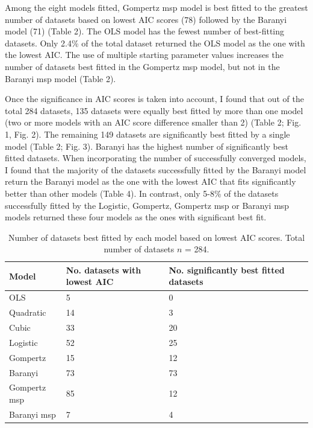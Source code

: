 \documentclass[11pt]{article}
\begin{document}
Among the eight models fitted, Gompertz msp model is best fitted to the greatest number of datasets based on lowest AIC scores (78) followed by the Baranyi model (71) (Table 2). The OLS model has the fewest number of best-fitting datasets. Only 2.4\% of the total dataset returned the OLS model as the one with the lowest AIC. The use of multiple starting parameter values increases the number of datasets best fitted in the Gompertz msp model, but not in the Baranyi msp model (Table 2).
\vspace{\baselineskip}

Once the significance in AIC scores is taken into account, I found that out of the total 284 datasets, 135 datasets were equally best fitted by more than one model (two or more models with an AIC score difference smaller than 2) (Table 2; Fig. 1, Fig. 2). The remaining 149 datasets are significantly best fitted by a single model (Table 2; Fig. 3). Baranyi has the highest number of significantly best fitted datasets. When incorporating the number of successfully converged models, I found that the majority of the datasets successfully fitted by the Baranyi model return the Baranyi model as the one with the lowest AIC that fits significantly better than other models (Table 4). In contrast, only 5-8\% of the datasets successfully fitted by the Logistic, Gompertz, Gompertz msp or Baranyi msp models returned these four models as the ones with significant best fit.
\vspace{\baselineskip}
\vspace{\baselineskip}
\vspace{\baselineskip}

\begin{table}[]
\caption{Number of datasets best fitted by each model based on lowest AIC scores. Total number of datasets \(n\) = 284.}
\begin{tabular}{@{}lllll@{}}
\toprule
Model        & No. datasets with lowest AIC & No. significantly best fitted datasets &  &  \\ \midrule
OLS          & 5                            & 0                                      &  &  \\
Quadratic    & 14                           & 3                                      &  &  \\
Cubic        & 33                           & 20                                     &  &  \\
Logistic     & 52                           & 25                                     &  &  \\
Gompertz     & 15                           & 12                                     &  &  \\ 
Baranyi      & 73                           & 73                                     &  &  \\
Gompertz msp & 85                           & 12                                     &  &  \\
Baranyi msp  & 7                            & 4                                      &  & 
\end{tabular}
\end{table}
\end{document}
